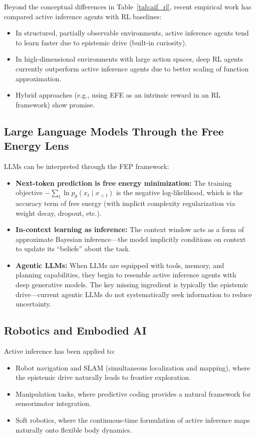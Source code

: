 \documentclass[11pt,a4paper]{article}
\theoremstyle{definition}
\begin{document}
Beyond the conceptual differences in Table~\ref{tab:aif_rl}, recent empirical
work has compared active inference agents with RL baselines:

\begin{itemize}[leftmargin=2em]
  \item In structured, partially observable environments, active inference
    agents tend to learn faster due to epistemic drive (built-in curiosity).
  \item In high-dimensional environments with large action spaces, deep RL
    agents currently outperform active inference agents due to better scaling
    of function approximation.
  \item Hybrid approaches (e.g., using EFE as an intrinsic reward in an RL
    framework) show promise.
\end{itemize}

\subsection{Large Language Models Through the Free Energy Lens}

LLMs can be interpreted through the FEP framework:
\begin{itemize}[leftmargin=2em]
  \item \textbf{Next-token prediction is free energy minimization:} The
    training objective $-\sum_t \ln p_\theta(x_t \mid x_{<t})$ is the negative
    log-likelihood, which is the accuracy term of free energy (with implicit
    complexity regularization via weight decay, dropout, etc.).
  \item \textbf{In-context learning as inference:} The context window acts as
    a form of approximate Bayesian inference---the model implicitly conditions
    on context to update its ``beliefs'' about the task.
  \item \textbf{Agentic LLMs:} When LLMs are equipped with tools, memory, and
    planning capabilities, they begin to resemble active inference agents with
    deep generative models.  The key missing ingredient is typically the
    epistemic drive---current agentic LLMs do not systematically seek
    information to reduce uncertainty.
\end{itemize}

\subsection{Robotics and Embodied AI}

Active inference has been applied to:
\begin{itemize}[leftmargin=2em]
  \item Robot navigation and SLAM (simultaneous localization and mapping),
    where the epistemic drive naturally leads to frontier exploration.
  \item Manipulation tasks, where predictive coding provides a natural framework
    for sensorimotor integration.
  \item Soft robotics, where the continuous-time formulation of active inference
    maps naturally onto flexible body dynamics.
\end{itemize}
\end{document}
